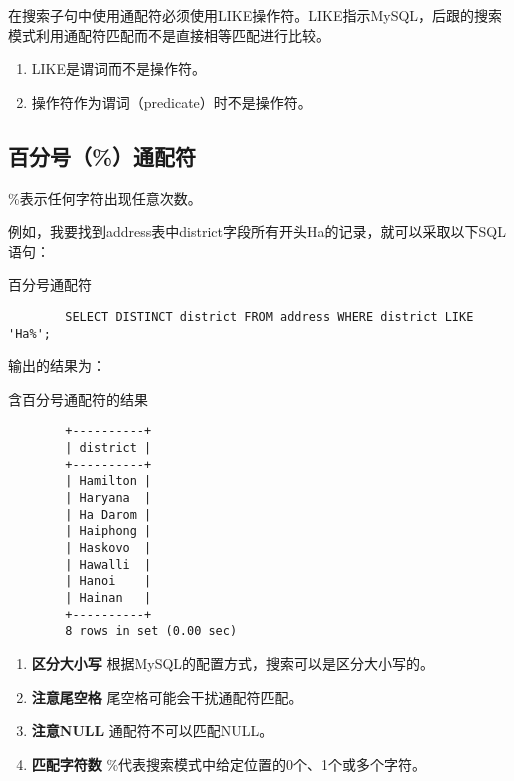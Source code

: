 \documentclass[UTF8]{article}
\begin{document}
在搜索子句中使用通配符必须使用LIKE操作符。LIKE指示MySQL，后跟的搜索模式利用通配符匹配而不是直接相等匹配进行比较。

\begin{orangebox}[frametitle={Tips 8.1}]
\begin{enumerate}
        \item LIKE是谓词而不是操作符。
        \item 操作符作为谓词（predicate）时不是操作符。
\end{enumerate}  
\end{orangebox}

\subsection{百分号（\%）通配符}

\begin{redbox}[frametitle={Defination 8.2 百分号（\%）通配符}]
        \%表示任何字符出现任意次数。
\end{redbox}

例如，我要找到address表中district字段所有开头Ha的记录，就可以采取以下SQL语句：
\begin{listing}[H]
	\caption{百分号通配符}
	\label{code:percentsignwildcard}
\begin{verbatim}
        SELECT DISTINCT district FROM address WHERE district LIKE 'Ha%';
\end{verbatim}
\end{listing}

输出的结果为：

\begin{listing}[H]
	\caption{含百分号通配符的结果}
	\label{code:percentsignwildcardresult}
\begin{verbatim}
        +----------+
        | district |
        +----------+
        | Hamilton |
        | Haryana  |
        | Ha Darom |
        | Haiphong |
        | Haskovo  |
        | Hawalli  |
        | Hanoi    |
        | Hainan   |
        +----------+
        8 rows in set (0.00 sec)
\end{verbatim}
\end{listing}

\begin{orangebox}[frametitle={Tips 8.2}]
        \begin{enumerate}
                \item \textbf{区分大小写 }  根据MySQL的配置方式，搜索可以是区分大小写的。
                \item \textbf{注意尾空格 } 尾空格可能会干扰通配符匹配。
                \item \textbf{注意NULL } 通配符不可以匹配NULL。
                \item \textbf{匹配字符数 } \%代表搜索模式中给定位置的0个、1个或多个字符。
        \end{enumerate}      
\end{orangebox}
\end{document}
